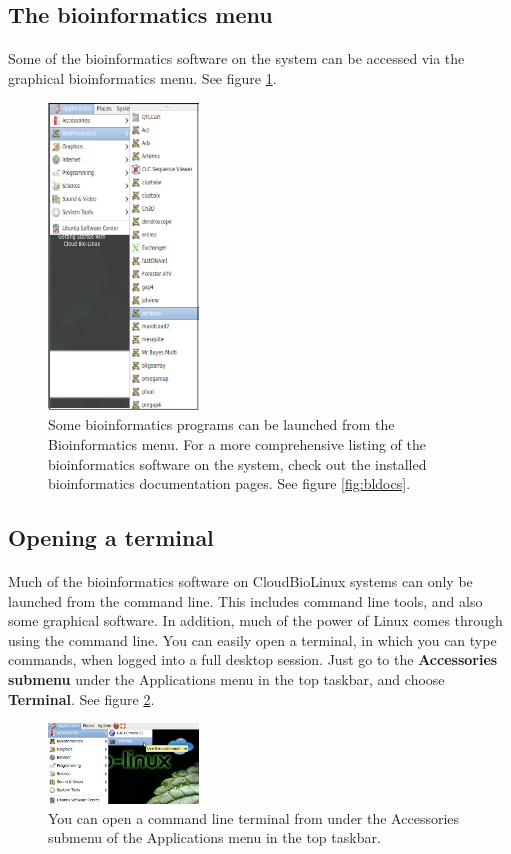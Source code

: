 \subsection{The bioinformatics menu}

\paragraph{}Some of the bioinformatics software on the system can be accessed via the graphical bioinformatics menu. See figure \ref{fig:bioinfmenu}. 

\begin{figure}
\includegraphics[width=40mm]{"images/bioinfMenuNX2"}
\caption[Bioinformatics menu]{\label{fig:bioinfmenu}Some bioinformatics programs can be launched from the Bioinformatics menu. For a more comprehensive listing of the bioinformatics software on the system, check out the installed bioinformatics documentation pages. See figure \ref{fig:bldocs}.}
\end{figure}


\subsection{Opening a terminal}

\paragraph{}Much of the bioinformatics software on CloudBioLinux systems can only be launched from the command line. This includes command line tools, and also some graphical software. In addition, much of the power of Linux comes through using the command line. You can easily open a terminal, in which you can type commands, when logged into a full desktop session. Just go to the \textbf{Accessories submenu} under the Applications menu in the top taskbar, and choose \textbf{Terminal}. See figure \ref{fig:NXterminal}. 


\begin{figure}
\includegraphics[width=40mm]{"images/openTerminalNX"}
\caption[Open terminal]{\label{fig:NXterminal}You can open a command line terminal from under the Accessories submenu of the Applications menu in the top taskbar.}
\end{figure}
